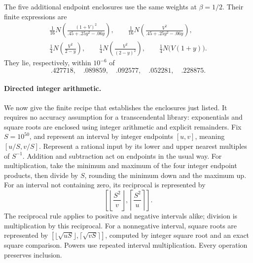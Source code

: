 The five additional endpoint enclosures use the same weights at
\(\beta=1/2\). Their finite expressions are
\begin{equation}
 \begin{gathered}
 \frac1{16}N\!\left(\frac{(1+V)^2}{.45+.25y^2-.06y}\right),\qquad
 \frac1{16}N\!\left(\frac{V^2}{.45+.25y^2-.06y}\right),\\
 \frac14N\!\left(\frac{V^2}{2-y}\right),\qquad
 \frac14N\!\left(\frac{V^2}{(2-y)^2}\right),\qquad
 \frac14N\bigl(V(1+y)\bigr).
 \end{gathered}
 \label{rcut:eq:scalar-five-sums}
\end{equation}
They lie, respectively, within \(10^{-6}\) of
\begin{equation}
 .427718,\quad .089859,\quad .092577,\quad .052281,\quad .228875.
 \label{rcut:eq:scalar-five-finite-values}
\end{equation}

\paragraph{Directed integer arithmetic.}
We now give the finite recipe that establishes the enclosures just
listed. It requires no accuracy assumption for a transcendental
library: exponentials and square roots are enclosed using integer
arithmetic and explicit remainders.
Fix \(S=10^{50}\), and represent an interval by integer endpoints
\([u,v]\), meaning \([u/S,v/S]\). Represent a rational input by its
lower and upper nearest multiples of \(S^{-1}\). Addition and
subtraction act on endpoints in the usual way. For multiplication,
take the minimum and maximum of the four integer endpoint products,
then divide by \(S\), rounding the minimum down and the maximum up.
For an interval not containing zero, its reciprocal is represented by
\[
 \left[\left\lfloor\frac{S^2}{v}\right\rfloor,
        \left\lceil\frac{S^2}{u}\right\rceil\right].
\]
The reciprocal rule applies to positive and negative intervals alike;
division is multiplication by this reciprocal. For a nonnegative
interval, square roots are represented
by \([\lfloor\sqrt{uS}\rfloor,\lceil\sqrt{vS}\rceil]\), computed by
integer square root and an exact square comparison. Powers use
repeated interval multiplication. Every operation preserves inclusion.


